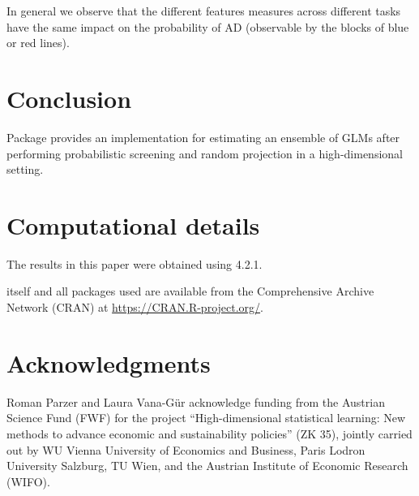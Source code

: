 \documentclass[
  article]{jss}
\begin{document}
In general we observe that the different features measures across
different tasks have the same impact on the probability of AD
(observable by the blocks of blue or red lines).

\section{Conclusion}\label{sec-conclusion}

Package  provides an implementation for estimating an ensemble
of GLMs after performing probabilistic screening and random projection
in a high-dimensional setting.

\section*{Computational details}\label{computational-details}

The results in this paper were obtained using  4.2.1.

 itself and all packages used are available from the
Comprehensive  Archive Network (CRAN) at
\url{https://CRAN.R-project.org/}.

\section*{Acknowledgments}\label{acknowledgments}

Roman Parzer and Laura Vana-Gür acknowledge funding from the Austrian
Science Fund (FWF) for the project ``High-dimensional statistical
learning: New methods to advance economic and sustainability policies''
(ZK 35), jointly carried out by WU Vienna University of Economics and
Business, Paris Lodron University Salzburg, TU Wien, and the Austrian
Institute of Economic Research (WIFO).


\renewcommand\refname{References}
  
\end{document}

